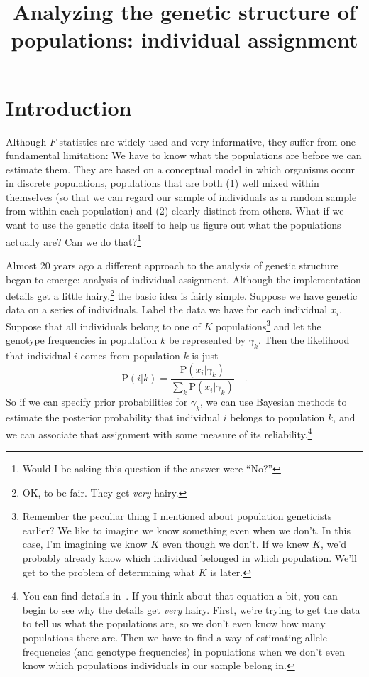 \documentclass[12pt]{article}
\title{Analyzing the genetic structure of populations: individual assignment}
\begin{document}
\maketitle

\thispagestyle{first}

\section*{Introduction}

Although $F$-statistics are widely used and very informative, they
suffer from one fundamental limitation: We have to know what the
populations are before we can estimate them. They are based on a
conceptual model in which organisms occur in discrete populations,
populations that are both (1) well mixed within themselves (so that we
can regard our sample of individuals as a random sample from within
each population) and (2) clearly distinct from others. What if we want
to use the genetic data itself to help us figure out what the
populations actually are? Can we do that?\footnote{Would I be asking
  this question if the answer were ``No?''}

Almost 20 years ago a different approach to the analysis of genetic
structure began to emerge: analysis of individual
assignment. Although the implementation
details get a little hairy,\footnote{OK, to be fair. They get {\it
    very\/} hairy.} the basic idea is fairly simple. Suppose we have
genetic data on a series of individuals. Label the data we have for
each individual $x_i$. Suppose that all individuals belong to one of
$K$ populations\footnote{Remember the peculiar thing I mentioned about
  population geneticists earlier? We like to imagine we know something
  even when we don't. In this case, I'm imagining we know $K$ even
  though we don't. If we knew $K$, we'd probably already know which
  individual belonged in which population. We'll get to the problem of
  determining what $K$ is later.} and let the genotype frequencies in
population $k$ be represented by $\gamma_k$. Then the likelihood that
individual $i$ comes from population $k$ is just
\[
\mbox{P}(i|k) = \frac{\mbox{P}(x_i|\gamma_k)}{\sum_k
  \mbox{P}(x_i|\gamma_k)} \quad .
\]
So if we can specify prior probabilities for $\gamma_k$, we can use
Bayesian methods to estimate the posterior probability that individual
$i$ belongs to population $k$, and we can associate that assignment
with some measure of its reliability.\footnote{You can find details
  in~\cite{Pritchard-etal-2000}. If you think about that equation a
  bit, you can begin to see why the details get {\it very\/}
  hairy. First, we're trying to get the data to tell us what the
  populations are, so we don't even know how many populations there
  are. Then we have to find a way of estimating allele frequencies
  (and genotype frequencies) in populations when we don't even
  know which populations individuals in our sample belong in.}
\end{document}
